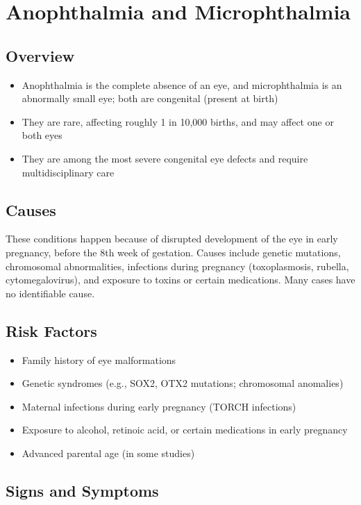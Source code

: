 \chapter{Anophthalmia and Microphthalmia}
\label{sec:Anophthalmia and Microphthalmia}

\section{Overview}
\begin{itemize}[noitemsep]
  \item Anophthalmia is the complete absence of an eye, and microphthalmia is an abnormally small eye; both are congenital (present at birth)
  \item They are rare, affecting roughly 1 in 10,000 births, and may affect one or both eyes
  \item They are among the most severe congenital eye defects and require multidisciplinary care
\end{itemize}
\section{Causes}
These conditions happen because of disrupted development of the eye in early pregnancy, before the 8th week of gestation. Causes include genetic mutations, chromosomal abnormalities, infections during pregnancy (toxoplasmosis, rubella, cytomegalovirus), and exposure to toxins or certain medications. Many cases have no identifiable cause.
\section{Risk Factors}
\begin{itemize}[noitemsep]
  \item Family history of eye malformations
  \item Genetic syndromes (e.g., SOX2, OTX2 mutations; chromosomal anomalies)
  \item Maternal infections during early pregnancy (TORCH infections)
  \item Exposure to alcohol, retinoic acid, or certain medications in early pregnancy
  \item Advanced parental age (in some studies)
\end{itemize}
\section{Signs and Symptoms}
